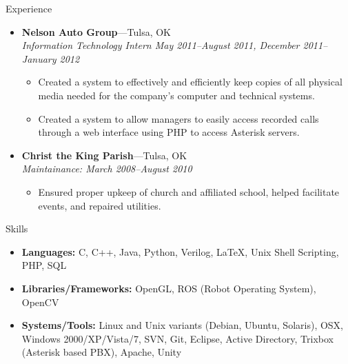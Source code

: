 \documentclass[10pt,oneside]{article}
\newenvironment{ressection}[1]{
	\vspace{4pt}
	{\fontfamily{phv}\selectfont\Large#1}
	\begin{itemize}
	\vspace{3pt}
}{
	\end{itemize}
}
\newcommand{\resitem}[1]{
	\vspace{-4pt}
	\item \begin{flushleft} #1 \end{flushleft}
}
\newcommand{\ressubitem}[1]{
	\vspace{-1pt}
	\item \begin{flushleft} #1 \end{flushleft}
}
\newcommand{\resbigitem}[3]{
	\vspace{-5pt}
	\item
	\textbf{#1}---#2 \\
	\textit{#3}
}
\newenvironment{ressubsec}[3]{
	\resbigitem{#1}{#2}{#3}
	\vspace{-2pt}
	\begin{itemize}
}{
	\end{itemize}
}
\begin{document}
\begin{ressection}{Experience}
	\begin{comment}
	\begin{ressubsec}{Car Country}{Tulsa, OK}{Currier December 2010--January 2011 (Winter Break)}
		\ressubitem{Transported documents and payments to and from businesses and banks.}
	\end{ressubsec}
	\end{comment}
	\begin{ressubsec}{Nelson Auto Group}{Tulsa, OK}{Information Technology Intern May 2011--August 2011, December 2011--January 2012}
		\ressubitem{Created a system to effectively and efficiently keep copies of all physical media needed for the company's computer and technical systems.}
		\ressubitem{Created a system to allow managers to easily access recorded calls through a web interface using PHP to access Asterisk servers.}
	\end{ressubsec}
	\begin{ressubsec}{Christ the King Parish}{Tulsa, OK}{Maintainance:  March 2008--August 2010}
		\ressubitem{Ensured proper upkeep of church and affiliated school, helped facilitate events, and repaired utilities.}
	\end{ressubsec}
	
	\begin{comment}
	\begin{ressubsec}{Tulsa Day Center For the Homeless}{Tulsa, OK}{Volunteer:  July 2006--September 2009}
		\ressubitem{Worked mainly with individuals receiving tuberculosis tests.}
		\ressubitem{Entered tuberculosis data and kept computerized records between the Day Center for the Homeless and the Tulsa City-County Health Department up to date.}
	\end{ressubsec}
	\end{comment}

\end{ressection}


\begin{ressection}{Skills}

	\resitem{\textbf{Languages:} C, C++, Java, Python, Verilog, \LaTeX, Unix Shell Scripting, PHP, SQL }
	\resitem{\textbf{Libraries/Frameworks:} OpenGL, ROS (Robot Operating System), OpenCV }
	\resitem{\textbf{Systems/Tools:} Linux and Unix variants (Debian, Ubuntu, Solaris), OSX, Windows 2000/XP/Vista/7, SVN, Git, Eclipse, Active Directory, Trixbox (Asterisk based PBX), Apache, Unity }
	
\end{ressection}
\end{document}
